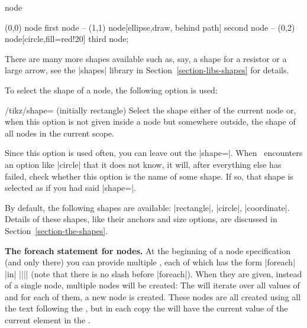 \begin{pathoperation}{node}{%
    }
\begin{codeexample}[]
\tikz \fill[fill=yellow!80!black]
      (0,0) node                            {first node}
   -- (1,1) node[ellipse,draw, behind path] {second node}
   -- (0,2) node[circle,fill=red!20]        {third node};
\end{codeexample}

  There are many more shapes available such as, say, a shape for a
  resistor or a large arrow, see the |shapes| library in
  Section~\ref{section-libs-shapes} for details.

  To select the shape of a node, the following option is used:
  \begin{key}{/tikz/shape= (initially rectangle)}
    Select the shape either of the current node or, when this option is
    not given inside a node but somewhere outside, the shape of all
    nodes in the current scope.%

    Since this option is used often, you can leave out the
    |shape=|. When \tikzname\ encounters an option like |circle|
    that it does not know, it will, after everything else has failed,
    check whether this option is the name of some shape. If so, that
    shape is selected as if you had said |shape=|.

    By default, the following shapes are available: |rectangle|,
    |circle|, |coordinate|. Details of these shapes, like their anchors
    and size options, are discussed in Section~\ref{section-the-shapes}.
  \end{key}

  \medskip
  \textbf{The foreach statement for nodes.}
  At the beginning of a node specification (and only there) you can provide multiple
  , each of which has the form |foreach| 
  |in| |{||}| (note that there is no slash before
  |foreach|). When they are given, instead of a single node, multiple
  nodes will be created: The  will iterate over all values
  of  and for each of them, a new node is created. These
  nodes are all created using all the text following the , but in each copy the  will have the current
  value of the current element in the .


\end{pathoperation}
